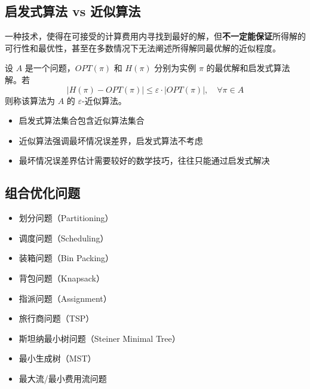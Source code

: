 \subsection{启发式算法 vs 近似算法}

\begin{definition}[启发式算法]
一种技术，使得在可接受的计算费用内寻找到最好的解，但\textbf{不一定能保证}所得解的可行性和最优性，甚至在多数情况下无法阐述所得解同最优解的近似程度。
\end{definition}

\begin{definition}
设 $A$ 是一个问题，$OPT(\pi)$ 和 $H(\pi)$ 分别为实例 $\pi$ 的最优解和启发式算法解。若
\[
|H(\pi) - OPT(\pi)| \leq \varepsilon \cdot |OPT(\pi)|,\quad \forall \pi \in A
\]
则称该算法为 $A$ 的 $\varepsilon$-近似算法。
\end{definition}

\begin{property}[启发式与近似的区别]
\begin{itemize}[itemsep=0.3em]
    \item 启发式算法集合包含近似算法集合
    \item 近似算法强调最坏情况误差界，启发式算法不考虑
    \item 最坏情况误差界估计需要较好的数学技巧，往往只能通过启发式解决
\end{itemize}
\end{property}

\subsection{组合优化问题}

\begin{conceptbox}[经典组合优化问题]
\begin{itemize}[itemsep=0.2em]
    \item 划分问题（Partitioning）
    \item 调度问题（Scheduling）
    \item 装箱问题（Bin Packing）
    \item 背包问题（Knapsack）
    \item 指派问题（Assignment）
    \item 旅行商问题（TSP）
    \item 斯坦纳最小树问题（Steiner Minimal Tree）
    \item 最小生成树（MST）
    \item 最大流/最小费用流问题
\end{itemize}
\end{conceptbox}

